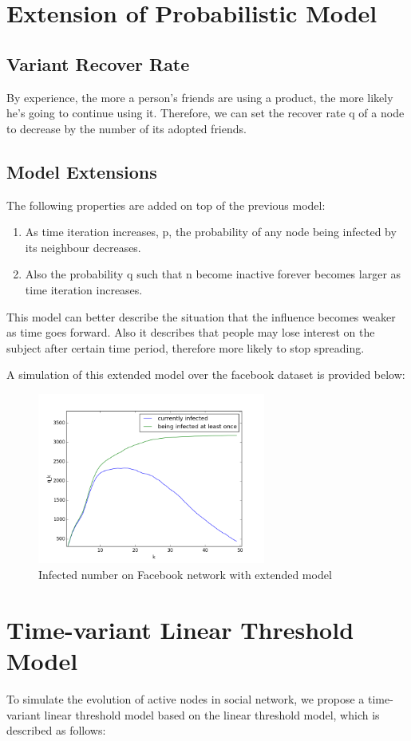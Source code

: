 \documentclass{article}
\begin{document}
\section{Extension of Probabilistic Model}
\subsection{Variant Recover Rate}
By experience, the more a person's friends are using a product, the more likely he's going to continue using it. Therefore, we can set the recover rate q of a node to decrease by the number of its adopted friends.

\subsection{Model Extensions}
The following properties are added on top of the previous model: 
\begin{enumerate}
\item As time iteration increases, p, the probability of any node being infected by its neighbour decreases. 
\item Also the probability q such that n become inactive forever becomes larger as time iteration increases.
\end{enumerate}

This model can better describe the situation that the influence becomes weaker as time goes forward. Also it describes that people may lose interest on the subject after certain time period, therefore more likely to stop spreading. 

A simulation of this extended model over the facebook dataset is provided below:

\begin{figure}[H]
\centering
\includegraphics[width=7.5cm]{plotfb.png}
\caption{Infected number on Facebook network with extended model}
\end{figure}

\section{Time-variant Linear Threshold Model}
To simulate the evolution of active nodes in social network, we propose a time-variant linear threshold model based on the linear threshold model, which is described as follows:
\end{document}
